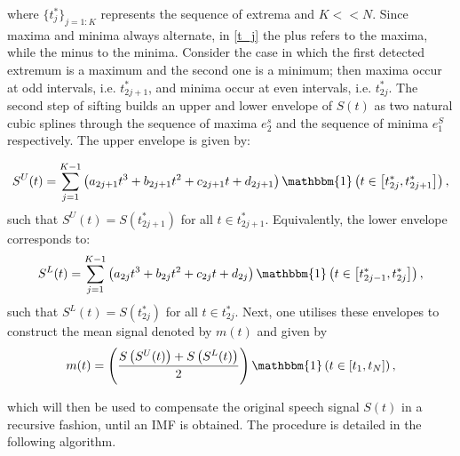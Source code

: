 where $ \{ t_j^{*} \}_{j = 1: K}$ represents the sequence of extrema and $K << N$. Since maxima and minima always alternate, in \ref{t_j} the plus refers to the maxima, while the minus to the minima. Consider the case in which the first detected extremum is a maximum and the second one is a minimum; then maxima occur at odd intervals, i.e. $t^*_{2j+1}$, and minima occur at even intervals, i.e. $t^*_{2j}$. The second step of sifting builds an upper and lower envelope of $S(t)$ as two natural cubic splines through the sequence of maxima $e_2^s$ and the sequence of minima $e_1^S$ respectively. The upper envelope is given by:

\begin{equation}
\label{upper_env}
S^{U}(t) = \sum_{j=1}^{K-1} \left( a_{2j+1}  t^3 + b_{2j+1} t^2 + c_{2j+1} t  +d_{2j+1} \right) \mathbbm{1} \left( t \in \left[ t^*_{2j}, t^*_{2j+1} \right] \right),
\end{equation}
such that $S^U (t) = S(t^*_{2j+1})$ for all $ t \in t^*_{2j+1}$. Equivalently, the lower envelope corresponds to: 
\begin{equation}
\label{lower_env}
S^{L}(t) = \sum_{j=1}^{K-1} \left( a_{2j}  t^3 + b_{2j} t^2 + c_{2j} t  +d_{2j} \right)   \mathbbm{1} \left( t \in \left[ t^*_{2j-1}, t^*_{2j} \right] \right),
\end{equation}
such that $S^L (t) = S(t^*_{2j})$ for all $ t \in t^*_{2j}$. Next, one utilises these envelopes to construct the mean signal denoted by $m(t)$ and given by
\begin{equation}
m(t) = \left( \frac{S \left( S^{U}(t) \right)+S \left( S^{L}(t) \right)}{2} \right) \mathbbm{1} \left( t \in [t_1, t_N] \right),
\end{equation}

which will then be used to compensate the original speech signal $S(t)$ in a recursive fashion, until an IMF is obtained.  The procedure is detailed in the following algorithm.

